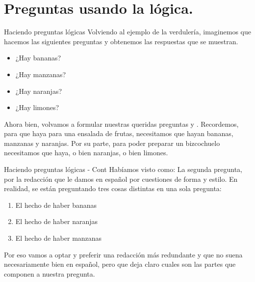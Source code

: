 
\section{Preguntas usando la lógica.}


\begin{frame}{Haciendo preguntas lógicas}
  Volviendo al ejemplo de la verdulería, imaginemos que hacemos las siguientes
  preguntas y obtenemos las respuestas que se muestran.
  \jump
  \begin{itemize}
    \item ¿Hay bananas? \true
    \item ¿Hay manzanas? \true
    \item ¿Hay naranjas? \false
    \item ¿Hay limones? \true
  \end{itemize}
  \jump
  Ahora bien, volvamos a formular nuestras queridas preguntas
   y
  .
  Recordemos, para que haya para una ensalada de frutas, necesitamos que hayan
  bananas, manzanas y naranjas. Por su parte, para poder preparar un bizcochuelo
  necesitamos que haya, o bien naranjas, o bien limones.
\end{frame}


\begin{frame}{Haciendo preguntas lógicas - Cont}
  Habíamos visto como:
  \jump
  \jump
  La segunda pregunta, por la redacción que le damos en español por cuestiones
  de forma y estilo.
  \jump
  En realidad, se están preguntando tres cosas distintas en una sola pregunta:
  \begin{enumerate}
    \item El hecho de haber bananas
    \item El hecho de haber naranjas
    \item El hecho de haber manzanas
  \end{enumerate}
  \jump
  Por eso vamos a optar y preferir una redacción más redundante y que no suena
  necesariamente bien en español, pero que deja claro cuales son las partes que
  componen a nuestra pregunta.
\end{frame}

